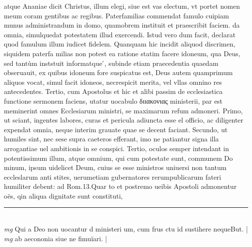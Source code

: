 \documentclass{article}
\begin{document}
\begin{pages}
atque  Ananiae dicit Christus, illum elegi, siue est vas electum, vt portet nomen meum coram gentibus ac regibus. Paterfamilias commendat famulo cuipiam munus administrandum in domo, quamobrem instituit et praescribit faciem. da omnia, simulquedat potestatem illud exercendi. Istud vero dum facit, declarat quod famulum illum iudicet fidelem. Quanquam hic incidit aliquod discrimen, siquidem paterfa milias non potest ea ratione statim facere idoneum, qua Deus, sed tantùm inststuit informatque ́, subinde etiam praecedentia quaedam obseruauit, ex quibus idoneum fore suspicatus est, Deus autem quamprimum aliquos vocat, simul facit idoneos, necrespicit merita, vel vllas omnino res antecedentes. Tertio, cum Apostolus et hic et alibi passim de ecclesiastica functione sermonem faciens, utatur uocabulo διιακονιας ministerii, par est meminerint omnes Ecclesiarum ministri, se maximarum refum admoneri. Primo, ut sciant, ingentes labores, curas et pericula adiuncta esse el officio, ac diligenter expendat omnia, neque  interim grauate quae se decent faciant. Secundo, ut humiles sint, nec sese supra caeteros efferant, imo ne patiantur signa illa arrogantiae uel ambitionis in se conspici. Tertio, oculos semper intendant in potentissimum illum, atque  omnium, qui cum potestate sunt, communem Do minum, ipsum uidelicet Deum, cuius se esse ministros uniuersi non tantum eccleslarum anti stites, uerumetiam gubernatores rerumpublicarum fateri humiliter debent: ad Rom.13.Quar to et postremo ueibis Apostoli admonentur oës, qin aliqua dignitate sunt constituti,  \pend
\vspace{0.5cm}\noindent
\vspace{0.2cm}\rule{1cm}{0.2pt}\\ 
\hspace{0.2cm}\textit{mg}
\footnotesize Qui a Deo non uocantur d ministeri um, cum frus ctu id sustihere nequeBut. 
\normalsize| 
\hspace{0.2cm}\textit{mg}
\footnotesize ab aecononia siue ne fimuïari. 
\normalsize| 

\end{pages}
\end{document}

